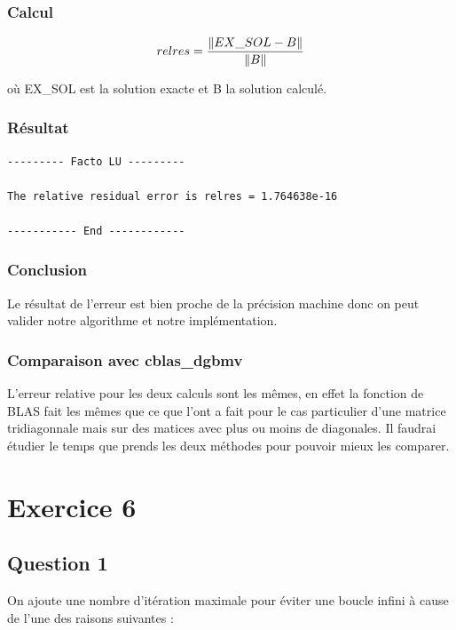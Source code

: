 \documentclass[11pt]{article}
\DeclarePairedDelimiter{\norm}{\lVert}{\rVert}
\begin{document}
\subsubsection{Calcul}

\begin{equation*}
relres = \frac{\norm{EX\_SOL - B}}{\norm{B}}
\end{equation*}

où EX\_SOL est la solution exacte et B la solution calculé.

\subsubsection{Résultat}

\begin{lstlisting}
--------- Facto LU ---------

The relative residual error is relres = 1.764638e-16

----------- End ------------
\end{lstlisting}

\subsubsection{Conclusion}

Le résultat de l'erreur est bien proche de la précision machine donc
on peut valider notre algorithme et notre implémentation.

\subsubsection{Comparaison avec cblas\_dgbmv}

L'erreur relative pour les deux calculs sont les mêmes, en effet la
fonction de BLAS fait les mêmes que ce que l'ont a fait pour le
cas particulier d'une matrice tridiagonnale mais sur des matices avec
plus ou moins de diagonales. Il faudrai étudier le temps que prends les
deux méthodes pour pouvoir mieux les comparer.

\section{Exercice 6}

\subsection{Question 1}

On ajoute une nombre d'itération maximale pour éviter une boucle
infini à cause de l'une des raisons suivantes :
\end{document}
